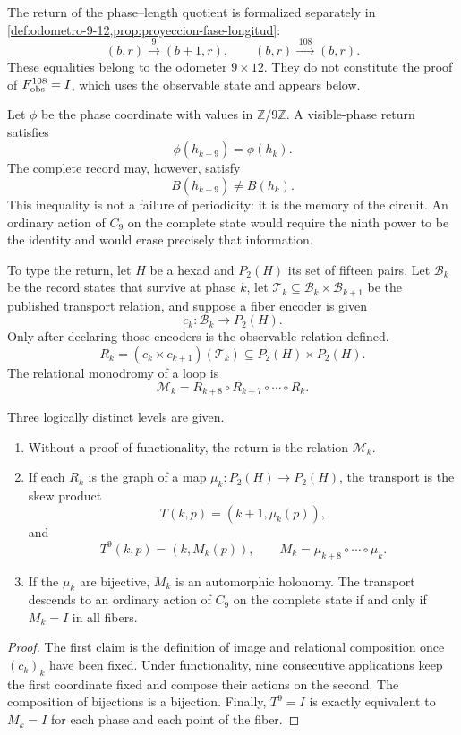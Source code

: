 The return of the phase--length quotient is formalized separately in
\cref{def:odometro-9-12,prop:proyeccion-fase-longitud}:
\[
(b,r)\xrightarrow{\;9\;}(b+1,r),
\qquad
(b,r)\xrightarrow{\;108\;}(b,r).
\]
These equalities belong to the odometer \(9\times12\). They do not constitute the
proof of \(F_{\rm obs}^{108}=I\), which uses the observable state and appears
below.

Let \(\phi\) be the phase coordinate with values in \(\mathbb Z/9\mathbb Z\).
A visible-phase return satisfies
\[
 \phi(h_{k+9})=\phi(h_k).
\]
The complete record may, however, satisfy
\[
 B(h_{k+9})\ne B(h_k).
\]
This inequality is not a failure of periodicity: it is the memory of the circuit.
An ordinary action of \(C_9\) on the complete state would require the
ninth power to be the identity and would erase precisely that information.

To type the return, let \(H\) be a hexad and \(P_2(H)\) its set of
fifteen pairs. Let \(\mathcal B_k\) be the record states that survive at phase
\(k\), let \(\mathcal T_k\subseteq\mathcal B_k\times\mathcal B_{k+1}\) be the published transport relation, and
suppose a fiber encoder is given
\[
 c_k:\mathcal B_k\longrightarrow P_2(H).
\]
Only after declaring those encoders is the observable relation defined.
\[
 R_k=(c_k\times c_{k+1})(\mathcal T_k)
 \subseteq P_2(H)\times P_2(H).
\]
The relational monodromy of a loop is
\[
 \mathcal M_k
 =R_{k+8}\circ R_{k+7}\circ\cdots\circ R_k.
\]

\begin{proposition}
\label{prop:clasificacion-retorno-nonadico}
Three logically distinct levels are given.
\begin{enumerate}
  \item Without a proof of functionality, the return is the relation
  \(\mathcal M_k\).
  \item If each \(R_k\) is the graph of a map
  \(\mu_k:P_2(H)\to P_2(H)\), the transport is the skew product
  \[
   T(k,p)=(k+1,\mu_k(p)),
  \]
  and
  \[
   T^9(k,p)=(k,M_k(p)),
   \qquad
   M_k=\mu_{k+8}\circ\cdots\circ\mu_k.
  \]
  \item If the \(\mu_k\) are bijective, \(M_k\) is an automorphic holonomy.
  The transport descends to an ordinary action of
  \(C_9\) on the complete state if and only if \(M_k=I\) in all
  fibers.
\end{enumerate}
\end{proposition}

\begin{proof}
The first claim is the definition of image and relational composition once
\((c_k)_k\) have been fixed. Under
functionality, nine consecutive applications keep the first
coordinate fixed and compose their actions on the second. The composition of
bijections is a bijection. Finally, \(T^9=I\) is exactly equivalent to
\(M_k=I\) for each phase and each point of the fiber.
\end{proof}

